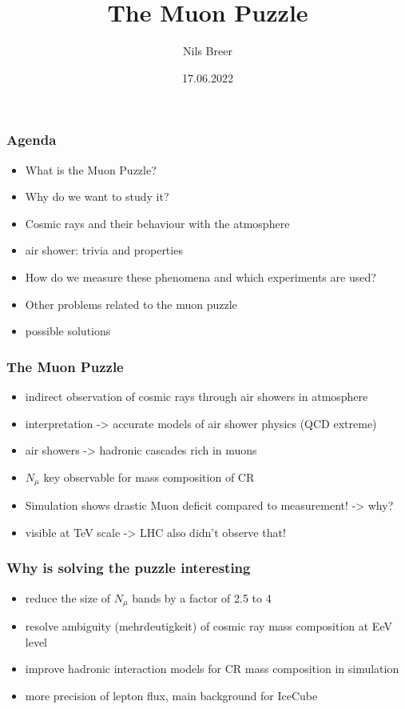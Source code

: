\documentclass[aspectratio=1610, 9pt]{beamer}
\title{The Muon Puzzle}
\author[N.Breer]{Nils Breer}
\institute{Fakultät Physik}
\date{17.06.2022}
\begin{document}
\maketitle

\begin{frame}\frametitle{Agenda}
  \begin{itemize}
    \item What is the Muon Puzzle?
    \item Why do we want to study it?
    \item Cosmic rays and their behaviour with the atmosphere
    \item air shower: trivia and properties
    \item How do we measure these phenomena and which experiments are used?
    \item Other problems related to the muon puzzle
    \item possible solutions
  \end{itemize}
\end{frame}

\begin{frame}\frametitle{The Muon Puzzle}
  \begin{itemize}
    \item indirect observation of cosmic rays through air showers in atmosphere
    \item interpretation -> accurate models of air shower physics (QCD extreme)
    \item air showers -> hadronic cascades rich in muons
    \item $N_\mu$ key observable for mass composition of CR
    \item Simulation shows drastic Muon deficit compared to measurement! -> why?
    \item visible at TeV scale -> LHC also didn't observe that!
  \end{itemize}
\end{frame}

\begin{frame}\frametitle{Why is solving the puzzle interesting}
  \begin{itemize}
    \item reduce the size of $N_\mu$ bands by a factor of 2.5 to 4
    \item resolve ambiguity (mehrdeutigkeit) of cosmic ray mass composition at EeV level
    \item improve hadronic interaction models for CR mass composition in simulation
    \item more precision of lepton flux, main background for IceCube
  \end{itemize}
\end{frame}
\end{document}

